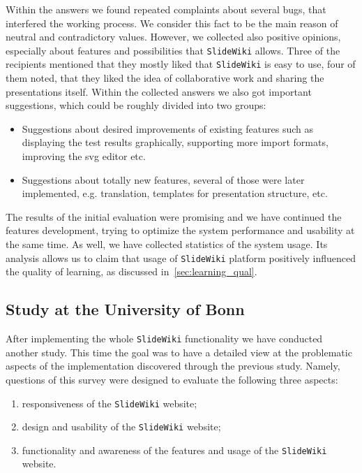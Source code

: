 \documentclass[PhD, Submit, ngerman,UKenglish,table]{scrbook}
\begin{document}
Within the answers we found repeated complaints about several bugs, that interfered the working process.
We consider this fact to be the main reason of neutral and contradictory values.
However, we collected also positive opinions, especially about features and possibilities that \texttt{SlideWiki} allows.
Three of the recipients mentioned that they mostly liked that \texttt{SlideWiki} is easy to use, four of them noted, that they liked the idea of collaborative work and sharing the presentations itself.
Within the collected answers we also got important suggestions, which could be roughly divided into two groups:
\begin{itemize}
	\item Suggestions about desired improvements of existing features such as displaying the test results graphically, supporting more import formats, improving the \gls{svg} editor etc.
	\item Suggestions about totally new features, several of those were later implemented, e.g. translation, templates for presentation structure, etc.
\end{itemize}

The results of the initial evaluation were promising and we have continued the features development, trying to optimize the system performance and usability at the same time.
As well, we have collected statistics of the system usage.
Its analysis allows us to claim that usage of \texttt{SlideWiki} platform positively influenced the quality of learning, as discussed in~\autoref{sec:learning_qual}.

\subsection{Study at the University of Bonn}
After implementing the whole \texttt{SlideWiki} functionality we have conducted another study.
This time the goal was to have a detailed view at the problematic aspects of the implementation discovered through the previous study. 
Namely, questions of this survey were designed to evaluate the following three aspects:

\begin{enumerate}
\item responsiveness of the \texttt{SlideWiki} website;
\item design and usability of the \texttt{SlideWiki} website;
\item functionality and awareness of the features and usage of the \texttt{SlideWiki} website.
\end{enumerate}
\end{document}
